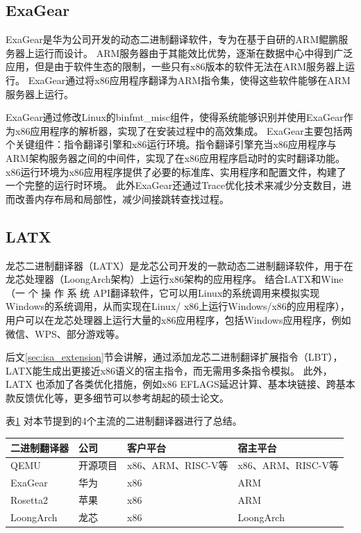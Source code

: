 \subsection{ExaGear}

ExaGear是华为公司开发的动态二进制翻译软件，专为在基于自研的ARM鲲鹏服务器上运行而设计。
ARM服务器由于其能效比优势，逐渐在数据中心中得到广泛应用，但是由于软件生态的限制，一些只有x86版本的软件无法在ARM服务器上运行。
ExaGear通过将x86应用程序翻译为ARM指令集，使得这些软件能够在ARM服务器上运行。

ExaGear通过修改Linux的binfmt\_misc组件，使得系统能够识别并使用ExaGear作为x86应用程序的解析器，实现了在安装过程中的高效集成。
ExaGear主要包括两个关键组件：指令翻译引擎和x86运行环境。指令翻译引擎充当x86应用程序与ARM架构服务器之间的中间件，实现了在x86应用程序启动时的实时翻译功能。
x86运行环境为x86应用程序提供了必要的标准库、实用程序和配置文件，构建了一个完整的运行时环境。
此外ExaGear还通过Trace优化技术来减少分支数目，进而改善内存布局和局部性，减少间接跳转查找过程\cite{LvYandong2021}。

\subsection{LATX}

龙芯二进制翻译器（LATX）是龙芯公司开发的一款动态二进制翻译软件，用于在龙芯处理器（LoongArch架构）上运行x86架构的应用程序。
结合LATX和Wine\cite{amstadt1994wine}（一 个 操 作 系 统 API翻译软件，它可以用Linux的系统调用来模拟实现Windows的系统调用，从而实现在Linux/ x86上运行Windows/x86的应用程序），
用户可以在龙芯处理器上运行大量的x86应用程序，包括Windows应用程序，例如微信、WPS、部分游戏等。

后文\ref{sec:isa_extension}节会讲解，通过添加龙芯二进制翻译扩展指令（LBT），LATX能生成出更接近x86语义的宿主指令，而无需用多条指令模拟。
此外，LATX 也添加了各类优化措施，例如x86 EFLAGS延迟计算、基本块链接、跨基本款反馈优化等，更多细节可以参考胡起的硕士论文\cite{HuQi2023}。

表\ref{tab:BTs} 对本节提到的4个主流的二进制翻译器进行了总结。

\begin{table}[!htbp]
  \centering
  \footnotesize%
  \setlength{\tabcolsep}{4pt}%
  \renewcommand{\arraystretch}{1.2}%
  \label{tab:BTs}
    \begin{tabular}{llll}
    \hline
    二进制翻译器    & 公司   & 客户平台           & 宿主平台           \\ \hline
    QEMU      & 开源项目 & x86、ARM、RISC-V等 & x86、ARM、RISC-V等  \\
    ExaGear   & 华为   & x86            & ARM            \\
    Rosetta2  & 苹果   & x86            & ARM            \\
    LoongArch & 龙芯   & x86            & LoongArch      \\ \hline
    \end{tabular}
    \end{table}

